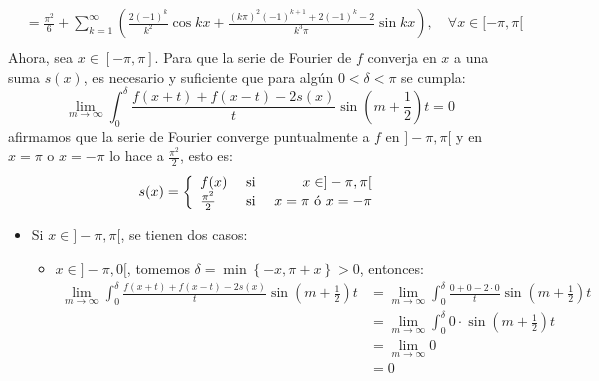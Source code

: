 \documentclass[12pt]{report}
\newcounter{it}
\theoremstyle{largebreak}
\begin{document}
\begin{sol}
\begin{equation*}
\begin{split}
                &=\frac{\pi^2}{6}+\sum_{ k=1}^\infty\left(\frac{2(-1)^k}{k^2}\cos kx+\frac{(k\pi)^2(-1)^{k+1}+2(-1)^k-2}{k^3\pi}\sin kx\right),\quad\forall x\in[-\pi,\pi[ \\
            \end{split}
        \end{equation*}
        Ahora, sea $x\in[-\pi,\pi]$. Para que la serie de Fourier de $f$ converja en $x$ a una suma $s(x)$, es necesario y suficiente que para algún $0<\delta<\pi$ se cumpla:
        \begin{equation*}
            \lim_{m\rightarrow\infty}\int_{0}^\delta\frac{f(x+t)+f(x-t)-2s(x)}{t}\sin\left(m+\frac{1}{2}\right)t=0
        \end{equation*}
        afirmamos que la serie de Fourier converge puntualmente a $f$ en $]-\pi,\pi[$ y en $x=\pi$ o $x=-\pi$ lo hace a $\frac{\pi^2}{2}$, esto es:
        \begin{equation*}
            s(x)=\left\{
                \begin{array}{lcr}
                    f(x) & \textup{ si } & x\in]-\pi,\pi[\\
                    \frac{\pi^2}{2} & \textup{ si } & x=\pi\textup{ ó }x=-\pi\\
                \end{array}
            \right.
        \end{equation*}
        \begin{itemize}
            \item Si $x\in]-\pi,\pi[$, se tienen dos casos:
            \begin{itemize}
                \item $x\in]-\pi,0[$, tomemos $\delta=\min\left\{-x,\pi+x\right\}>0$, entonces:
                \begin{equation*}
                    \begin{split}
                        \lim_{m\rightarrow\infty}\int_{0}^\delta\frac{f(x+t)+f(x-t)-2s(x)}{t}\sin\left(m+\frac{1}{2}\right)t&=\lim_{m\rightarrow\infty}\int_{0}^{\delta}\frac{0+0-2\cdot0}{t}\sin\left(m+\frac{1}{2}\right)t\\
                        &=\lim_{m\rightarrow\infty}\int_{0}^{\delta}0\cdot\sin\left(m+\frac{1}{2}\right)t\\
                        &=\lim_{m\rightarrow\infty}0\\
                        &=0\\
                    \end{split}

\end{equation*}
\end{itemize}
\end{itemize}
\end{sol}
\end{document}
